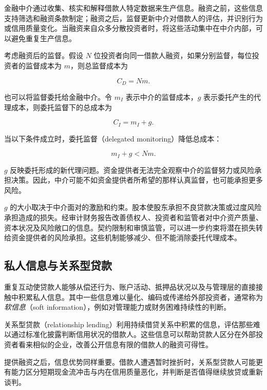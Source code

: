 金融中介通过收集、核实和解释借款人特定数据来生产信息。融资之前，这些信息支持筛选和融资条款制定；融资之后，监督更新中介对借款人的评估，并识别行为或信用质量变化。当融资来自众多分散投资者时，将这些活动集中在中介内部，可以避免重复生产信息。

考虑融资后的监督。假设 $N$ 位投资者向同一借款人融资，如果分别监督，每位投资者的监督成本为 $m$，则总监督成本为

\begin{equation}
C_D=Nm.
\label{eq:ch4-direct-monitoring}
\end{equation}

也可以将监督委托给金融中介。令 $m_I$ 表示中介的监督成本，$g$ 表示委托产生的代理成本，则委托监督下的总成本为

\begin{equation}
C_I=m_I+g.
\label{eq:ch4-delegated-monitoring}
\end{equation}

当以下条件成立时，委托监督（delegated monitoring）降低总成本：

\begin{equation}
m_I+g<Nm.
\label{eq:ch4-delegation-condition}
\end{equation}

$g$ 反映委托形成的新代理问题。资金提供者无法完全观察中介的监督努力或风险承担决策。因此，中介可能不如资金提供者所希望的那样认真监督，也可能承担更多风险。

$g$ 的大小取决于中介面对的激励和约束。股本使股东承担不良贷款决策或过度风险承担造成的损失。经审计财务报告改善债权人、投资者和监管者对中介资产质量、资本状况及风险敞口的信息。契约限制和审慎监管，可以进一步约束将潜在损失转给资金提供者的风险承担。这些机制能够减少、但不能消除委托代理成本。

\subsection{私人信息与关系型贷款}

重复互动使贷款人能够从偿还行为、账户活动、抵押品状况以及与管理层的直接接触中积累私人信息。其中一些信息难以量化、编码或传递给外部投资者，通常称为\emph{软信息}（soft information），例如对管理能力或财务困难持续性的判断。

关系型贷款（relationship lending）利用持续借贷关系中积累的信息，评估那些难以通过标准化披露判断信用状况的借款人。这些信息可以帮助贷款人区分在外部投资者看来相似的企业，改善公开信息有限的借款人的融资可得性。

提供融资之后，信息优势同样重要。借款人遭遇暂时挫折时，关系型贷款人可能更有能力区分短期现金流冲击与内在信用质量恶化，并判断是否值得继续放贷或重新谈判。

